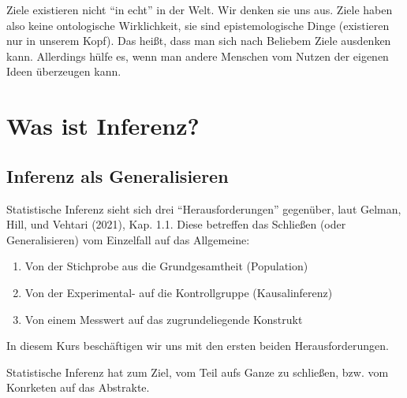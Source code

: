 \documentclass[
  a4paper,
  DIV=11]{scrreprt}
\providecommand{\tightlist}{%
  \setlength{\itemsep}{0pt}\setlength{\parskip}{0pt}}\usepackage{longtable,booktabs,array}
\theoremstyle{definition}
\theoremstyle{remark}
\begin{document}
\begin{tcolorbox}[enhanced jigsaw, left=2mm, colframe=quarto-callout-note-color-frame, opacityback=0, arc=.35mm, rightrule=.15mm, breakable, toptitle=1mm, colbacktitle=quarto-callout-note-color!10!white, colback=white, coltitle=black, bottomrule=.15mm, titlerule=0mm, opacitybacktitle=0.6, bottomtitle=1mm, title=\textcolor{quarto-callout-note-color}{\faInfo}\hspace{0.5em}{Hinweis}, toprule=.15mm, leftrule=.75mm]
Ziele existieren nicht ``in echt'' in der Welt. Wir denken sie uns aus.
Ziele haben also keine ontologische Wirklichkeit, sie sind
epistemologische Dinge (existieren nur in unserem Kopf). Das heißt, dass
man sich nach Beliebem Ziele ausdenken kann. Allerdings hülfe es, wenn
man andere Menschen vom Nutzen der eigenen Ideen überzeugen kann.
\end{tcolorbox}

\hypertarget{was-ist-inferenz}{%
\section{Was ist Inferenz?}\label{was-ist-inferenz}}

\hypertarget{inferenz-als-generalisieren}{%
\subsection{Inferenz als
Generalisieren}\label{inferenz-als-generalisieren}}

Statistische Inferenz sieht sich drei ``Herausforderungen'' gegenüber,
laut Gelman, Hill, und Vehtari (2021), Kap. 1.1. Diese betreffen das
Schließen (oder Generalisieren) vom Einzelfall auf das Allgemeine:

\begin{enumerate}
\def\labelenumi{\arabic{enumi}.}
\tightlist
\item
  Von der Stichprobe aus die Grundgesamtheit (Population)
\item
  Von der Experimental- auf die Kontrollgruppe (Kausalinferenz)
\item
  Von einem Messwert auf das zugrundeliegende Konstrukt
\end{enumerate}

In diesem Kurs beschäftigen wir uns mit den ersten beiden
Herausforderungen.

\begin{tcolorbox}[enhanced jigsaw, left=2mm, colframe=quarto-callout-important-color-frame, opacityback=0, arc=.35mm, rightrule=.15mm, breakable, toptitle=1mm, colbacktitle=quarto-callout-important-color!10!white, colback=white, coltitle=black, bottomrule=.15mm, titlerule=0mm, opacitybacktitle=0.6, bottomtitle=1mm, title=\textcolor{quarto-callout-important-color}{\faExclamation}\hspace{0.5em}{Wichtig}, toprule=.15mm, leftrule=.75mm]
Statistische Inferenz hat zum Ziel, vom Teil aufs Ganze zu schließen,
bzw. vom Konrketen auf das Abstrakte.
\end{tcolorbox}
\end{document}
